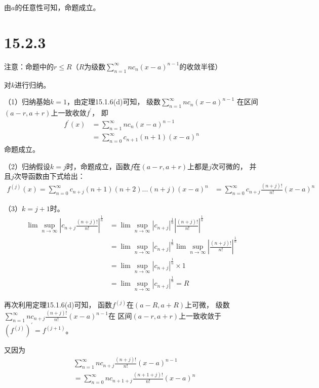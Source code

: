 \documentclass{article}
\begin{document}
由$a$的任意性可知，命题成立。

\section*{15.2.3}
注意：命题中的$r \leq R$（$R$为级数$\sum\limits_{n = 1}^\infty nc_n (x - a)^{n - 1}$的收敛半径）

对$k$进行归纳。

（1）归纳基始$k = 1$，由定理15.1.6(d)可知，
级数$\sum\limits_{n = 1}^\infty nc_n (x - a)^{n - 1}$
在区间$(a - r, a + r)$上一致收敛$f^\prime$，
即
\begin{align*}
  f^\prime(x) & = \sum\limits_{n = 1}^\infty nc_n (x - a)^{n - 1}         \\
              & = \sum\limits_{n = 0}^\infty c_{n + 1}(n + 1) (x - a)^{n}
\end{align*}
命题成立。

（2）归纳假设$k = j$时，命题成立，函数$f$在$(a - r, a + r)$上都是$j$次可微的，
并且$j$次导函数由下式给出：
\begin{align*}
  f^{(j)}(x) = \sum\limits_{n = 0}^\infty c_{n + j}(n+1)(n+2)...(n + j)(x - a)^n
   & = \sum\limits_{n = 0}^\infty c_{n+j}\frac{(n+j)!}{n!}(x - a)^n
\end{align*}

（3）$k = j+1$时。
\begin{align*}
  \lim\sup\limits_{n \to \infty} |c_{n+j}\frac{(n+j)!}{n!}|^{\frac{1}{n}}
   & = \lim\sup\limits_{n \to \infty} |c_{n+j}|^{\frac{1}{n}}|\frac{(n+j)!}{n!}|^{\frac{1}{n}}                                 \\
   & = \lim\sup\limits_{n \to \infty} |c_{n+j}|^{\frac{1}{n}} \lim\sup\limits_{n \to \infty} |\frac{(n+j)!}{n!}|^{\frac{1}{n}} \\
   & = \lim\sup\limits_{n \to \infty} |c_{n+j}|^{\frac{1}{n}} \times 1                                                         \\
   & = \lim\sup\limits_{n \to \infty} |c_{n+j}|^{\frac{1}{n}} = R
\end{align*}

再次利用定理15.1.6(d)可知，
函数$f^{(j)}$在$(a - R, a + R)$上可微，
级数$\sum\limits_{n = 1}^\infty nc_{n+j}\frac{(n+j)!}{n!}(x - a)^{n - 1}$在
区间$(a - r, a + r)$上一致收敛于$(f^{(j)})^\prime = f^{(j+1)}$。

又因为
\begin{align*}
   & \sum\limits_{n = 1}^\infty nc_{n+j}\frac{(n+j)!}{n!}(x - a)^{n - 1}   \\
   & = \sum\limits_{n = 0}^\infty nc_{n+1+j}\frac{(n+1+j)!}{n!}(x - a)^{n}
\end{align*}
\end{document}
